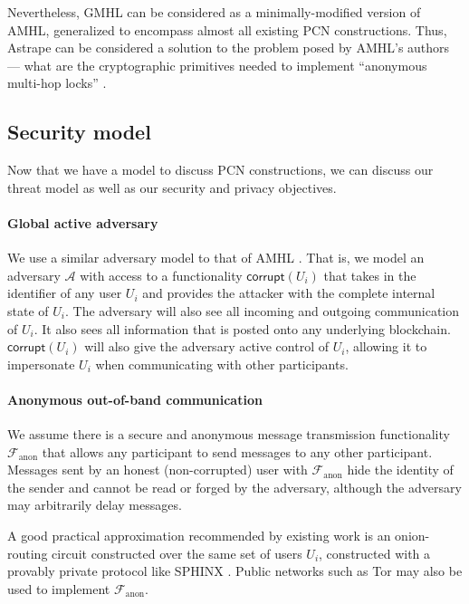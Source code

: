 \documentclass[USenglish,oneside,twocolumn]{article}
\begin{document}
Nevertheless, GMHL can be considered as a minimally-modified version of AMHL, generalized to encompass almost all existing PCN constructions. Thus, Astrape can be considered a solution to the problem posed by AMHL's authors --- what are the cryptographic primitives needed to implement ``anonymous multi-hop locks'' \cite{malavolta2019anonymous}.

\subsection{Security model}

Now that we have a model to discuss PCN constructions, we can discuss our threat model as well as our security and privacy objectives.

\paragraph*{Global active adversary} We use a similar adversary model to that of AMHL \cite{malavolta2019anonymous}. That is, we model an adversary $\mathcal{A}$ with access to a functionality $\mathsf{corrupt}(U_i)$ that takes in the identifier of any user $U_i$ and provides the attacker with the complete internal state of $U_i$. The adversary will also see all incoming and outgoing communication of $U_i$. It also sees all information that is posted onto any underlying blockchain. $\mathsf{corrupt}(U_i)$ will also give the adversary active control of $U_i$, allowing it to impersonate $U_i$ when communicating with other participants.

\paragraph*{Anonymous out-of-band communication} We assume there is a secure and anonymous message transmission functionality $\mathcal{F}_\mathrm{anon}$ that allows any participant to send messages to any other participant. Messages sent by an honest (non-corrupted) user with $\mathcal{F}_\mathrm{anon}$ hide the identity of the sender and cannot be read or forged by the adversary, although the adversary may arbitrarily delay messages.

A good practical approximation recommended by existing work \cite{malavolta2017concurrency,malavolta2019anonymous} is an onion-routing circuit constructed over the same set of users $U_i$, constructed with a provably private protocol like SPHINX \cite{danezis2009sphinx}. Public networks such as Tor may also be used to implement $\mathcal{F}_\mathrm{anon}$.
\end{document}
